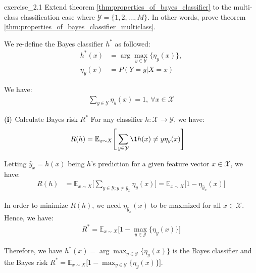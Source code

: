 \begin{exercise}{}{exercise_2.1}
    Extend theorem \ref{thm:properties_of_bayes_classifier} to the multi-class classification case where $\mathcal{Y}=\{1, 2, \dots, M\}$. In other words, prove theorem \ref{thm:properties_of_bayes_classifier_multiclass}.
\end{exercise}

\begin{solution*}
    We re-define the Bayes classifier $h^*$ as followed:
    \begin{align*}
        h^*(x) &= \arg\max_{y\in\mathcal{Y}} \Big\{ \eta_y(x) \Big\}, \\ 
        \eta_y(x) &= P(Y=y|X=x)
    \end{align*}

    \noindent We have:
    \begin{align*}
        \sum_{y\in\mathcal{Y}} \eta_y(x) = 1, \ \forall x \in \mathcal{X}
    \end{align*}

    \begin{subproof}{$\bf (i)$ Calculate Bayes risk $R^*$}
        For any classifier $h:\mathcal{X} \to \mathcal{Y}$, we have:
        \begin{align*}
            R(h) &= \mathbb{E}_{x\sim X}\Bigg[
                \sum_{y\in\mathcal{Y}} \1{h(x) \ne y}\eta_y(x)
            \Bigg]
        \end{align*}

        \noindent Letting $\hat y_x = h(x)$ being $h$'s prediction for a given feature vector $x\in\mathcal{X}$, we have:
        \begin{align*}
            R(h) &= \mathbb{E}_{x\sim X}\Bigg[
                \sum_{y\in\mathcal{Y};y\ne \hat y_x} \eta_y(x)
            \Bigg]
            = \mathbb{E}_{x\sim X}\Bigg[
                1 - \eta_{\hat y_x}(x)
            \Bigg]
        \end{align*}

        \noindent In order to minimize $R(h)$, we need $\eta_{\hat y_x}(x)$ to be maxmized for all $x\in\mathcal{X}$. Hence, we have:
        \begin{align*}
            R^* = \mathbb{E}_{x\sim X}\Bigg[
                1 - \max_{y\in\mathcal{Y}} \Big\{ \eta_y(x) \Big\}
            \Bigg]
        \end{align*}

        \noindent Therefore, we have $h^*(x) = \arg\max_{y\in\mathcal{Y}} \Big\{ \eta_y(x) \Big\}$ is the Bayes classifier and the Bayes risk $ R^* = \mathbb{E}_{x\sim X}\Bigg[1 - \max_{y\in\mathcal{Y}} \Big\{ \eta_y(x) \Big\}\Bigg]$.
    \end{subproof}


\end{solution*}
